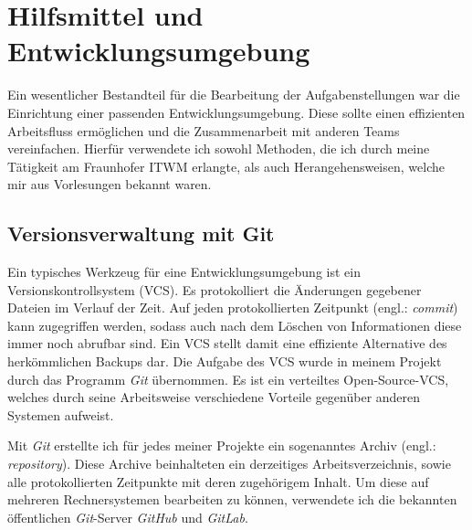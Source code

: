 \documentclass[crop=false]{standalone}
\begin{document}
  \section{Hilfsmittel und Entwicklungsumgebung} %
  \label{sec:Hilfsmittel und Entwicklungsumgebung}

  Ein wesentlicher Bestandteil für die Bearbeitung der Aufgabenstellungen war die Einrichtung einer passenden Entwicklungsumgebung.
  Diese sollte einen effizienten Arbeitsfluss ermöglichen und die Zusammenarbeit mit anderen Teams vereinfachen.
  Hierfür verwendete ich sowohl Methoden, die ich durch meine Tätigkeit am Fraunhofer ITWM erlangte, als auch Herangehensweisen, welche mir aus Vorlesungen bekannt waren.

  \subsection{Versionsverwaltung mit Git} %
  \label{sub:git}
    Ein typisches Werkzeug für eine Entwicklungsumgebung ist ein Versionskontrollsystem (VCS).
    Es protokolliert die Änderungen gegebener Dateien im Verlauf der Zeit.
    Auf jeden protokollierten Zeitpunkt (engl.: \textit{commit}) kann zugegriffen werden, sodass auch nach dem Löschen von Informationen diese immer noch abrufbar sind.
    Ein VCS stellt damit eine effiziente Alternative des herkömmlichen Backups dar.
    Die Aufgabe des VCS wurde in meinem Projekt durch das Programm \textit{Git} übernommen.
    Es ist ein verteiltes Open-Source-VCS, welches durch seine Arbeitsweise verschiedene Vorteile gegenüber anderen Systemen aufweist.

    Mit \textit{Git} erstellte ich für jedes meiner Projekte ein sogenanntes Archiv (engl.: \textit{repository}).
    Diese Archive beinhalteten ein derzeitiges Arbeitsverzeichnis, sowie alle protokollierten Zeitpunkte mit deren zugehörigem Inhalt.
    Um diese auf mehreren Rechnersystemen bearbeiten zu können, verwendete ich die bekannten öffentlichen \textit{Git}-Server \textit{GitHub} und \textit{GitLab}.
\end{document}
